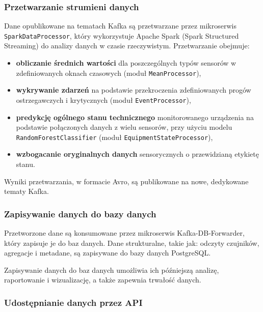 \subsubsection{Przetwarzanie strumieni danych}
\label{subsubsec:przetwarzanie_strumieni}

Dane opublikowane na tematach Kafka są przetwarzane przez mikroserwis \texttt{SparkDataProcessor}, który wykorzystuje Apache Spark (Spark Structured Streaming) \cite{spark_streaming} do analizy danych w czasie rzeczywistym. Przetwarzanie obejmuje:

\begin{itemize}
    \item \textbf{obliczanie średnich wartości} dla poszczególnych typów sensorów w zdefiniowanych oknach czasowych (moduł \texttt{MeanProcessor}),
    \item \textbf{wykrywanie zdarzeń} na podstawie przekroczenia zdefiniowanych progów ostrzegawczych i krytycznych (moduł \texttt{EventProcessor}),
    \item \textbf{predykcję ogólnego stanu technicznego} monitorowanego urządzenia na podstawie połączonych danych z wielu sensorów, przy użyciu modelu \texttt{RandomForestClassifier} (moduł \texttt{EquipmentStateProcessor}),
    \item \textbf{wzbogacanie oryginalnych danych} sensorycznych o przewidzianą etykietę stanu.
\end{itemize}

Wyniki przetwarzania, w formacie Avro, są publikowane na nowe, dedykowane tematy Kafka.

\subsubsection{Zapisywanie danych do bazy danych}
\label{subsubsec:zapisywanie_danych}

Przetworzone dane są konsumowane przez mikroserwis Kafka-DB-Forwarder, który zapisuje je do baz danych. Dane strukturalne, takie jak: odczyty czujników,
agregacje i metadane, są zapisywane do bazy danych PostgreSQL.

Zapisywanie danych do baz danych umożliwia ich późniejszą analizę, raportowanie i wizualizację, a także zapewnia trwałość danych.

\subsubsection{Udostępnianie danych przez API}
\label{subsubsec:udostepnianie_danych}

